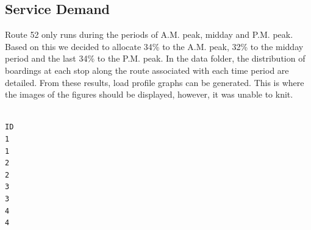 \documentclass[
11pt, %
oneside, %
english, %
singlespacing, %
]{macthesis} %
\begin{document}
\hypertarget{service-demand}{%
\subsection{Service Demand}\label{service-demand}}

Route 52 only runs during the periods of A.M. peak, midday and P.M. peak. Based on this we decided to allocate 34\% to the A.M. peak, 32\% to the midday period and the last 34\% to the P.M. peak. In the data folder, the distribution of boardings at each stop along the route associated with each time period are detailed. From these results, load profile graphs can be generated. This is where the images of the figures should be displayed, however, it was unable to knit.
\begin{verbatim}
                                                                                                                                                                                                                                                                                                                                                                                                                               ID
1                                                                                                                                                                                                                                                                                                                                                                                                                               1
2                                                                                                                                                                                                                                                                                                                                                                                                                               2
3                                                                                                                                                                                                                                                                                                                                                                                                                               3
4                                                                                                                                                                                                                                                                                                                                                                                                                               4

\end{verbatim}
\end{document}
